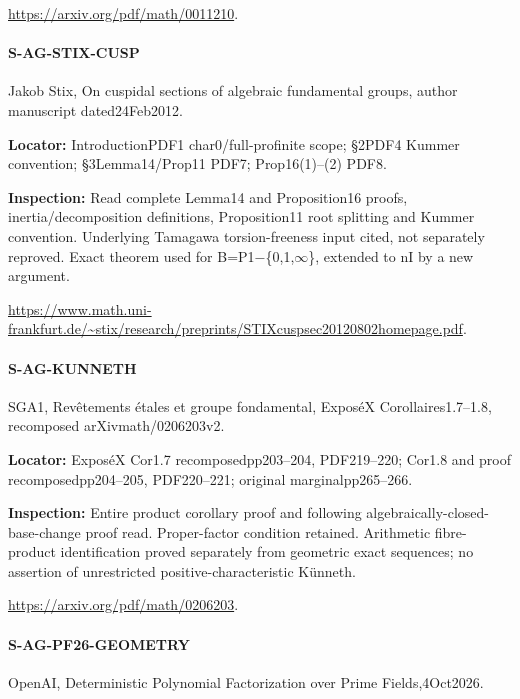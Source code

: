 \documentclass[11pt,a4paper]{article}
\begin{document}
\url{https://arxiv.org/pdf/math/0011210}.

\paragraph{S-AG-STIX-CUSP} Jakob Stix, On cuspidal sections of algebraic fundamental groups, author manuscript dated24Feb2012.

\textbf{Locator:} IntroductionPDF1 char0/\allowbreak{}full-profinite scope; §2PDF4 Kummer convention; §3Lemma14/\allowbreak{}Prop11 PDF7; Prop16(1)–\allowbreak{}(2) PDF8.

\textbf{Inspection:} Read complete Lemma14 and Proposition16 proofs, inertia/\allowbreak{}decomposition definitions, Proposition11 root splitting and Kummer convention.\allowbreak{} Underlying Tamagawa torsion-freeness input cited, not separately reproved.\allowbreak{} Exact theorem used for B=P1\ensuremath{-}\{0,1,\ensuremath{\infty}\}, extended to nI by a new argument.\allowbreak{}

\url{https://www.math.uni-frankfurt.de/~stix/research/preprints/STIXcuspsec20120802homepage.pdf}.

\paragraph{S-AG-KUNNETH} SGA1, Revêtements étales et groupe fondamental, ExposéX Corollaires1.\allowbreak{}7–\allowbreak{}1.\allowbreak{}8, recomposed arXivmath/\allowbreak{}0206203v2.

\textbf{Locator:} ExposéX Cor1.\allowbreak{}7 recomposedpp203–\allowbreak{}204, PDF219–\allowbreak{}220; Cor1.\allowbreak{}8 and proof recomposedpp204–\allowbreak{}205, PDF220–\allowbreak{}221; original marginalpp265–\allowbreak{}266.

\textbf{Inspection:} Entire product corollary proof and following algebraically-closed-base-change proof read.\allowbreak{} Proper-factor condition retained.\allowbreak{} Arithmetic fibre-product identification proved separately from geometric exact sequences; no assertion of unrestricted positive-characteristic Künneth.\allowbreak{}

\url{https://arxiv.org/pdf/math/0206203}.

\paragraph{S-AG-PF26-GEOMETRY} OpenAI, Deterministic Polynomial Factorization over Prime Fields,4Oct2026.
\end{document}
